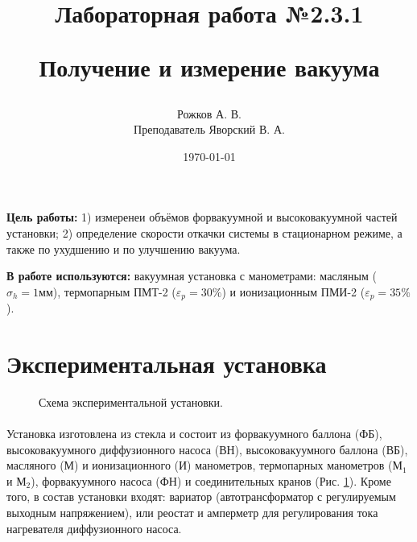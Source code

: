 \documentclass[a4paper, 12pt]{article}
\title{\begin{center}Лабораторная работа №2.3.1\end{center}
Получение и измерение вакуума}
\author{Рожков А. В. \\ Преподаватель Яворский В. А.}
\date{\today}
\begin{document}
    \maketitle
    \newpage

    \textbf{Цель работы:} 1) измеренеи объёмов форвакуумной и высоковакуумной частей установки; 2) определение скорости откачки системы в стационарном режиме, а также по ухудшению и по улучшению вакуума.

    \textbf{В работе используются:} вакуумная установка с манометрами: масляным ($\sigma_h = 1 мм$), термопарным ПМТ-2 ($\varepsilon_{p} = 30\%$) и ионизационным ПМИ-2 ($\varepsilon_{p} = 35\%$).

    \section{Экспериментальная установка}

    \begin{figure}[h]
        \caption{Схема экспериментальной установки.}
        \label{ris:ustanovka}
    \end{figure}

    \paragraph{}
    Установка изготовлена из стекла и состоит из форвакуумного баллона (ФБ), высоковакуумного диффузионного насоса (ВН), высоковакуумного баллона (ВБ), масляного (М) и ионизационного (И) манометров, термопарных манометров ($М_1$ и $М_2$), форвакуумного насоса (ФН) и соединительных кранов (Рис. \ref{ris:ustanovka}). Кроме того, в состав установки входят: вариатор (автотрансформатор с регулируемым выходным напряжением), или реостат и амперметр для регулирования тока нагревателя диффузионного насоса.
\end{document}

